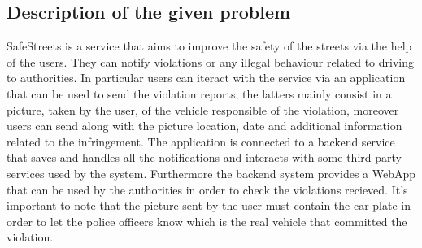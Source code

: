 \subsection{Description of the given problem}
SafeStreets is a service that aims to improve the safety of the streets via the help of the users. They can notify violations or any illegal behaviour related to driving to authorities. In particular users can iteract with the service via an application that can be used to send the violation reports; the latters mainly consist in a picture, taken by the user, of the vehicle responsible of the violation, moreover users can send along with the picture location, date and additional information related to the infringement. The application is connected to a backend service that saves and handles all the notifications and interacts with some third party services used by the system. Furthermore the backend system provides a WebApp that can be used by the authorities in order to check the violations recieved. It's important to note that the picture sent by the user must contain the car plate in order to let the police officers know which is the real vehicle that committed the violation.




